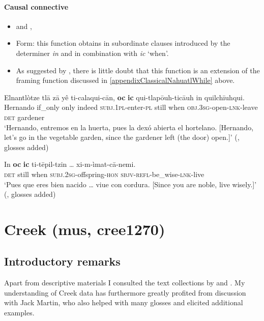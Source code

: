 \paragraph{Causal connective}
\label{appendixClassicalNahuatlCausal}
\begin{itemize}
	\item \textcite[503]{Carochi1645} and \textcite[1269]{Launey1986}, 
	\item Form: this function obtains in subordinate clauses introduced by the determiner \textit{in} and in combination with \textit{ic} \lq when'.
	\item As suggested by \textcite[1269]{Launey1986}, there is little doubt that this function is an extension of the framing function discussed in \ref{appendixClassicalNahuatlWhile} above.
\end{itemize}

\begin{exe}
	\ex
	\gll Elnantlòtze tlā zā yê ti-calaqui-cān, \textbf{oc} \textbf{ic} qui-tlapōuh-ticāuh in quilchīuhqui.\\
	Hernando if\_only only indeed \textsc{subj}.1\textsc{pl}-enter-\textsc{pl} still when \textsc{obj}.3\textsc{sg}-open-\textsc{lnk}-leave \textsc{det} gardener\\
	\glt \lq Hernando, entremos en la huerta, pues la dexó abierta el hortelano. [Hernando, let’s go in the vegetable garden, since the gardener left (the door) open.]' (\cite[503]{Carochi1645}, glosses added)
	
	\ex
	\gll In \textbf{oc} \textbf{ic} ti-tēpil-tzin … xi-m-ìmat-cā-nemi.\\
	\textsc{det} still when \textsc{subj}.2\textsc{sg}-offspring-\textsc{hon} {} \textsc{sbjv}-\textsc{refl}-be\_wise-\textsc{lnk}-live\\
	\glt \lq Pues que eres bien nacido … viue con cordura. [Since you are noble, live wisely.]' (\cite[503]{Carochi1645}, glosses added)
\end{exe}

\section{Creek (mus, cree1270)}
\subsection{Introductory remarks}
Apart from descriptive materials I consulted the text collections by \textcite{Gouge2004} and \textcite{HaasHill2014}. My understanding of Creek data has furthermore greatly profited from discussion with Jack Martin, who also helped with many glosses and elicited additional examples.

